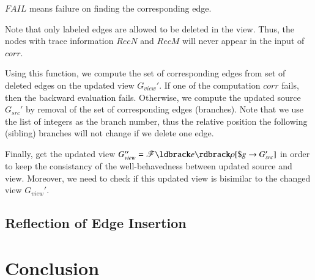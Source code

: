\documentclass{llncs}
\begin{document}
$FAIL$ means failure on finding the corresponding edge.

Note that only labeled edges are allowed to be deleted in the view. Thus, the nodes with trace information $RecN$ and $RecM$ will never appear in the input of $corr$.

Using this function, we compute the set of corresponding edges from set of deleted edges on the updated view $G_{view}'$. If one of the computation $corr$ fails, then the backward evaluation fails. Otherwise, we compute the updated source $G_{src}'$ by removal of the set of corresponding edges (branches). Note that we use the list of integers as the branch number, thus the relative position the following (sibling) branches will not change if we delete one edge.

Finally, get the updated view $G_{view}''=\mathscr{F}\ldbrack e\rdbrack\rho[\$g\rightarrow G_{src}']$ in order to keep the consistancy of the well-behavedness between updated source and view. Moreover, we need to check if this updated view is bisimilar to the changed view $G_{view}'$.

\subsection{Reflection of Edge Insertion}\label{subsec:bak-ins}
\section{Conclusion}\label{sec:con}
\end{document}
